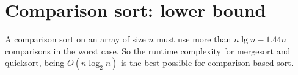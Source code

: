 \section{Comparison sort: lower bound}

A comparison sort on an array of size $n$
must use more than 
$n \lg n - 1.44 n$ 
comparisons in the worst case.  
So the runtime complexity for mergesort and quicksort, being $O(n \log_2 n)$
is the best possible for comparison based sort.

